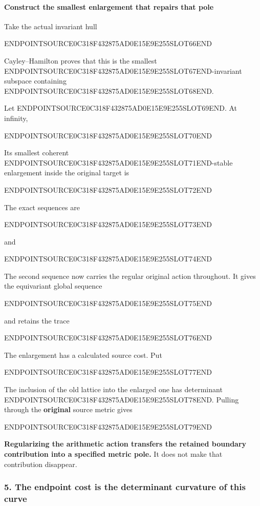 \paragraph{Construct the smallest enlargement that repairs that pole}\label{endpoint-curvature_original--construct-the-smallest-enlargement-that-repairs-that-pole}

Take the actual invariant hull

ENDPOINTSOURCE0C318F432875AD0E15E9E255SLOT66END

Cayley--Hamilton proves that this is the smallest ENDPOINTSOURCE0C318F432875AD0E15E9E255SLOT67END-invariant subspace containing ENDPOINTSOURCE0C318F432875AD0E15E9E255SLOT68END.

Let ENDPOINTSOURCE0C318F432875AD0E15E9E255SLOT69END. At infinity,

ENDPOINTSOURCE0C318F432875AD0E15E9E255SLOT70END

Its smallest coherent ENDPOINTSOURCE0C318F432875AD0E15E9E255SLOT71END-stable enlargement inside the original target is

ENDPOINTSOURCE0C318F432875AD0E15E9E255SLOT72END

The exact sequences are

ENDPOINTSOURCE0C318F432875AD0E15E9E255SLOT73END

and

ENDPOINTSOURCE0C318F432875AD0E15E9E255SLOT74END

The second sequence now carries the regular original action throughout. It gives the equivariant global sequence

ENDPOINTSOURCE0C318F432875AD0E15E9E255SLOT75END

and retains the trace

ENDPOINTSOURCE0C318F432875AD0E15E9E255SLOT76END

The enlargement has a calculated source cost. Put

ENDPOINTSOURCE0C318F432875AD0E15E9E255SLOT77END

The inclusion of the old lattice into the enlarged one has determinant ENDPOINTSOURCE0C318F432875AD0E15E9E255SLOT78END. Pulling through the \textbf{original} source metric gives

ENDPOINTSOURCE0C318F432875AD0E15E9E255SLOT79END

\textbf{Regularizing the arithmetic action transfers the retained boundary contribution into a specified metric pole.} It does not make that contribution disappear.

\subsubsection{5. The endpoint cost is the determinant curvature of this curve}\label{endpoint-curvature_original--the-endpoint-cost-is-the-determinant-curvature-of-this-curve}

